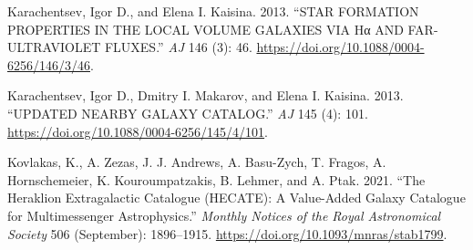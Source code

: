 \documentclass[
]{article}
\newlength{\cslhangindent}
\newenvironment{CSLReferences}[2] %
 {\begin{list}{}{%
  \setlength{\itemindent}{0pt}
  \setlength{\leftmargin}{0pt}
  \setlength{\parsep}{0pt}
  \ifodd #1
   \setlength{\leftmargin}{\cslhangindent}
   \setlength{\itemindent}{-1\cslhangindent}
  \fi
  \setlength{\itemsep}{#2\baselineskip}}}
 {\end{list}}
\begin{document}
\label{refs}
\begin{CSLReferences}{1}{0}
Karachentsev, Igor D., and Elena I. Kaisina. 2013. {``{STAR FORMATION
PROPERTIES IN THE LOCAL VOLUME GALAXIES VIA Hα AND FAR-ULTRAVIOLET
FLUXES}.''} \emph{AJ} 146 (3): 46.
\url{https://doi.org/10.1088/0004-6256/146/3/46}.

Karachentsev, Igor D., Dmitry I. Makarov, and Elena I. Kaisina. 2013.
{``{UPDATED NEARBY GALAXY CATALOG}.''} \emph{AJ} 145 (4): 101.
\url{https://doi.org/10.1088/0004-6256/145/4/101}.

Kovlakas, K., A. Zezas, J. J. Andrews, A. Basu-Zych, T. Fragos, A.
Hornschemeier, K. Kouroumpatzakis, B. Lehmer, and A. Ptak. 2021. {``The
{Heraklion Extragalactic Catalogue} ({HECATE}): A Value-Added Galaxy
Catalogue for Multimessenger Astrophysics.''} \emph{Monthly Notices of
the Royal Astronomical Society} 506 (September): 1896--1915.
\url{https://doi.org/10.1093/mnras/stab1799}.

\end{CSLReferences}
\end{document}
